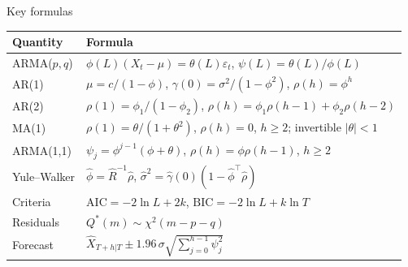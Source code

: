 \begin{frame}{Key formulas}
\itemsize{\small}
{\renewcommand{\arraystretch}{1.35}\begin{center}
\scriptsize
\begin{tabular}{ll}
\toprule
\textbf{Quantity} & \textbf{Formula} \\
\midrule
ARMA($p,q$) & $\phi(L)(X_t - \mu) = \theta(L)\varepsilon_t$, \quad $\psi(L) = \theta(L)/\phi(L)$ \\
AR(1) & $\mu = c/(1 - \phi)$, \quad $\gamma(0) = \sigma^2/(1 - \phi^2)$, \quad $\rho(h) = \phi^h$ \\
AR(2) & $\rho(1) = \phi_1/(1 - \phi_2)$, \quad $\rho(h) = \phi_1\rho(h - 1) + \phi_2\rho(h - 2)$ \\
MA(1) & $\rho(1) = \theta/(1 + \theta^2)$, \quad $\rho(h) = 0$, $h \ge 2$; invertible $|\theta| < 1$ \\
ARMA(1,1) & $\psi_j = \phi^{j-1}(\phi + \theta)$, \quad $\rho(h) = \phi\rho(h - 1)$, $h \ge 2$ \\
Yule--Walker & $\hat\phi = \hat R^{-1}\hat\rho$, \quad $\hat\sigma^2 = \hat\gamma(0)(1 - \hat\phi^\top\hat\rho)$ \\
Criteria & $\mathrm{AIC} = -2\ln L + 2k$, \quad $\mathrm{BIC} = -2\ln L + k\ln T$ \\
Residuals & $Q^*(m) \sim \chi^2(m - p - q)$ \\
Forecast & $\hat X_{T+h|T} \pm 1.96\,\sigma\sqrt{\textstyle\sum_{j=0}^{h-1}\psi_j^2}$ \\
\bottomrule
\end{tabular}
\end{center}
}
\end{frame}

